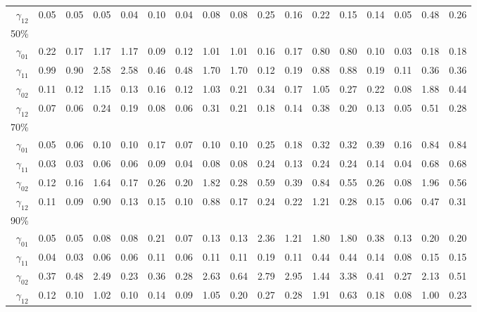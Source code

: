 \documentclass[useAMS,usenatbib,referee]{biom}
\begin{document}
\begin{table}
\begin{tabular}{rrrrrrrrrrrrrrrrr}
$\gamma_{12}$ & 0.05 & 0.05 & 0.05 & 0.04 & 0.10 & 0.04 & 0.08 & 0.08 & 0.25 & 0.16 & 0.22 & 0.15 & 0.14 & 0.05 & 0.48 & 0.26 \\
50\% \\
$\gamma_{01}$ & 0.22 & 0.17 & 1.17 & 1.17 & 0.09 & 0.12 & 1.01 & 1.01 & 0.16 & 0.17 & 0.80 & 0.80 & 0.10 & 0.03 & 0.18 & 0.18 \\
$\gamma_{11}$  & 0.99 & 0.90 & 2.58 & 2.58 & 0.46 & 0.48 & 1.70 & 1.70 & 0.12 & 0.19 & 0.88 & 0.88 & 0.19 & 0.11 & 0.36 & 0.36 \\
$\gamma_{02}$  & 0.11 & 0.12 & 1.15 & 0.13 & 0.16 & 0.12 & 1.03 & 0.21 & 0.34 & 0.17 & 1.05 & 0.27 & 0.22 & 0.08 & 1.88 & 0.44 \\
$\gamma_{12}$  & 0.07 & 0.06 & 0.24 & 0.19 & 0.08 & 0.06 & 0.31 & 0.21 & 0.18 & 0.14 & 0.38 & 0.20 & 0.13 & 0.05 & 0.51 & 0.28 \\
70\% \\
$\gamma_{01}$  & 0.05 & 0.06 & 0.10 & 0.10 & 0.17 & 0.07 & 0.10 & 0.10 & 0.25 & 0.18 & 0.32 & 0.32 & 0.39 & 0.16 & 0.84 & 0.84 \\
$\gamma_{11}$  & 0.03 & 0.03 & 0.06 & 0.06 & 0.09 & 0.04 & 0.08 & 0.08 & 0.24 & 0.13 & 0.24 & 0.24 & 0.14 & 0.04 & 0.68 & 0.68 \\
$\gamma_{02}$  & 0.12 & 0.16 & 1.64 & 0.17 & 0.26 & 0.20 & 1.82 & 0.28 & 0.59 & 0.39 & 0.84 & 0.55 & 0.26 & 0.08 & 1.96 & 0.56 \\
$\gamma_{12}$  & 0.11 & 0.09 & 0.90 & 0.13 & 0.15 & 0.10 & 0.88 & 0.17 & 0.24 & 0.22 & 1.21 & 0.28 & 0.15 & 0.06 & 0.47 & 0.31 \\
90\% \\
$\gamma_{01}$  & 0.05 & 0.05 & 0.08 & 0.08 & 0.21 & 0.07 & 0.13 & 0.13 & 2.36 & 1.21 & 1.80 & 1.80 & 0.38 & 0.13 & 0.20 & 0.20 \\
$\gamma_{11}$  & 0.04 & 0.03 & 0.06 & 0.06 & 0.11 & 0.06 & 0.11 & 0.11 & 0.19 & 0.11 & 0.44 & 0.44 & 0.14 & 0.08 & 0.15 & 0.15 \\
$\gamma_{02}$  & 0.37 & 0.48 & 2.49 & 0.23 & 0.36 & 0.28 & 2.63 & 0.64 & 2.79 & 2.95 & 1.44 & 3.38 & 0.41 & 0.27 & 2.13 & 0.51 \\
$\gamma_{12}$  & 0.12 & 0.10 & 1.02 & 0.10 & 0.14 & 0.09 & 1.05 & 0.20 & 0.27 & 0.28 & 1.91 & 0.63 & 0.18 & 0.08 & 1.00 & 0.23 \\
\hline
  \end{tabular}

\end{table}
\end{document}
